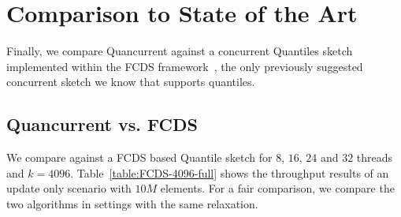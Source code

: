 \chapter{Comparison to State of the Art}
\label{appendix:compare}

Finally, we compare Quancurrent against a concurrent Quantiles sketch implemented within
the FCDS framework~\cite{Rinberg_2020_fast_sketches}, the only previously suggested concurrent sketch we know that
supports quantiles.

\section{Quancurrent vs. FCDS}

We compare \mysketch against a FCDS based Quantile sketch for $8$, $16$, $24$ and $32$ threads and $k = 4096$. Table~\ref{table:FCDS-4096-full} shows the throughput results of an update only scenario with $10M$ elements. For a fair comparison, we compare the two algorithms in settings with the same relaxation. 

